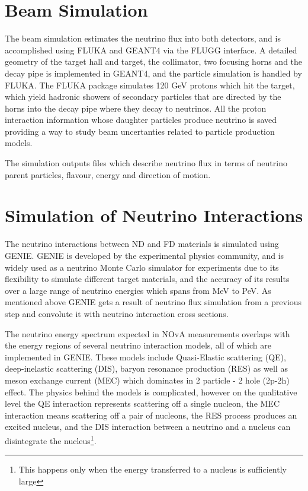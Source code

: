 \section{Beam Simulation}
The beam simulation estimates the neutrino flux into both detectors, and is accomplished using FLUKA and
GEANT4 via the FLUGG interface. A detailed geometry of the target hall and target, the collimator, two
focusing horns and the decay pipe is implemented in GEANT4, and the particle simulation is handled by
FLUKA. The FLUKA package simulates 120 GeV protons which hit the target, which yield hadronic 
showers of secondary particles that are directed by the horns into the decay pipe where they decay to 
neutrinos. All the proton interaction information whose daughter particles produce 
neutrino is saved providing a way to study beam uncertanties related to particle production models. 

The simulation outputs files which describe neutrino flux in terms of neutrino parent particles, 
flavour, energy and direction of motion.

\section{Simulation of Neutrino Interactions}
The neutrino interactions between ND and FD materials is simulated using GENIE. GENIE is developed
by the experimental physics community, and is widely used as a neutrino Monte Carlo simulator for experiments due
to its flexibility to simulate different target materials, and the accuracy of its results over a large
range of neutrino energies which spans from MeV to PeV. As mentioned above GENIE gets a result of neutrino 
flux simulation from a previous step and convolute it with neutrino interaction cross sections.

The neutrino energy spectrum expected in NOvA measurements overlaps
with the energy regions of several neutrino interaction models, all of which are implemented in GENIE.
These models include Quasi-Elastic scattering (QE), deep-inelastic scattering (DIS), baryon resonance
production (RES) as well as meson exchange current (MEC) which dominates in 2 particle - 2 hole (2p-2h) 
effect. The physics behind the models is complicated, however on the qualitative level the QE interaction 
represents scattering off a single nucleon, the MEC interaction means scattering off a pair of nucleons, 
the RES process produces an excited nucleus, and the DIS interaction between a neutrino and a nucleus can 
disintegrate the nucleus\footnote{This happens only when the energy transferred to a nucleus is 
sufficiently large}.

